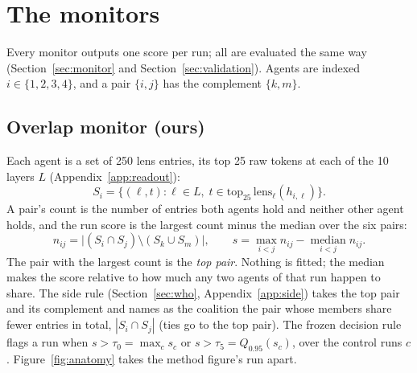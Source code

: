\documentclass[11pt]{article}
\begin{document}
\section{The monitors}\label{app:monitors}
Every monitor outputs one score per run; all are evaluated the same way (Section~\ref{sec:monitor} and Section~\ref{sec:validation}). Agents are indexed $i \in \{1,2,3,4\}$, and a pair $\{i,j\}$ has the complement $\{k,m\}$.

\begin{table}[h]
\centering\small
{}
\caption{\textbf{How the compared monitors differ.} All are scored on the same runs with the same AUROC, bootstrap and shuffle tests.}
\label{tab:methods}
\end{table}

\subsection{Overlap monitor (ours)}\label{app:det-overlap}
Each agent is a set of 250 lens entries, its top 25 raw tokens at each of the 10 layers $L$ (Appendix~\ref{app:readout}):
\[
S_i = \{(\ell, t) : \ell \in L,\; t \in \mathrm{top}_{25}\,\mathrm{lens}_\ell(h_{i,\ell})\}.
\]
A pair's count is the number of entries both agents hold and neither other agent holds, and the run score is the largest count minus the median over the six pairs:
\[
n_{ij} = \big|(S_i \cap S_j) \setminus (S_k \cup S_m)\big|, \qquad
s = \max_{i<j} n_{ij} - \operatorname*{median}_{i<j} n_{ij}.
\]
The pair with the largest count is the \emph{top pair}. Nothing is fitted; the median makes the score relative to how much any two agents of that run happen to share. The side rule (Section~\ref{sec:who}, Appendix~\ref{app:side}) takes the top pair and its complement and names as the coalition the pair whose members share fewer entries in total, $|S_i \cap S_j|$ (ties go to the top pair). The frozen decision rule flags a run when $s > \tau_0 = \max_c s_c$ or $s > \tau_5 = Q_{0.95}(s_c)$, over the control runs $c$. Figure~\ref{fig:anatomy} takes the method figure's run apart.
\end{document}

